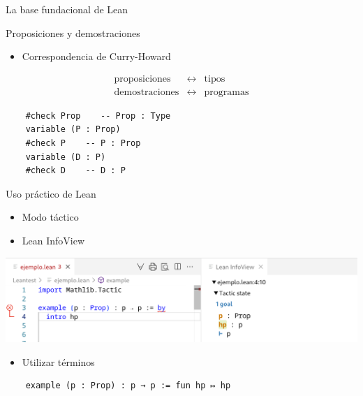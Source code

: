 \documentclass{beamer}
\begin{document}
\begin{frame}[fragile]{La base fundacional de Lean}

  \begin{center}
    \large{Proposiciones y demostraciones}
  \end{center}

  \begin{itemize}
    \item Correspondencia de Curry-Howard
  \end{itemize}

  $$
  \begin{array}{rcl}
    \text{proposiciones} & \longleftrightarrow & \text{tipos} \\
    \text{demostraciones} & \longleftrightarrow & \text{programas}
  \end{array}
  $$

  \begin{lstlisting}
    #check Prop    -- Prop : Type
    variable (P : Prop)
    #check P    -- P : Prop
    variable (D : P)
    #check D    -- D : P \end{lstlisting}

\end{frame}

\begin{frame}[fragile]{Uso práctico de Lean}
  \begin{itemize}
    \item Modo táctico
    \item Lean InfoView
  \end{itemize}

  \hspace{1cm}

  \includegraphics[width=\linewidth]{figuras/infoview.png}

  \hspace{1cm}

  \begin{itemize}
    \item Utilizar términos
  \end{itemize}

  \begin{lstlisting}
    example (p : Prop) : p → p := fun hp ↦ hp \end{lstlisting}
\end{frame}
\end{document}
